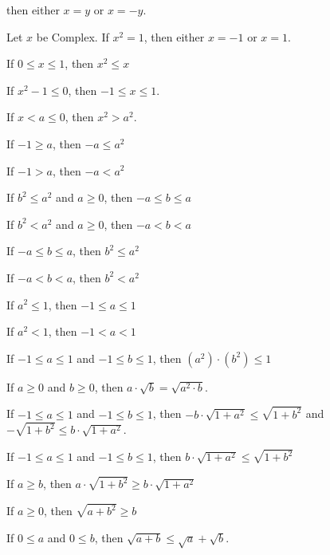 \documentclass{article}
\begin{document}
\begin{thm}
  then either $x=y$ or $x=-y$.
\item\label{square1:41} Let $x$ be Complex. If $x^{2}=1$, then either
  $x=-1$ or $x=1$.
\item\label{square1:42} If $0\leq x\leq1$, then $x^{2}\leq x$
\item\label{square1:43} If $x^{2}-1\leq0$, then $-1\leq x\leq1$.
\item\label{square1:44} If $x<a\leq0$, then $x^{2}>a^{2}$.
\item\label{square1:45} If $-1\geq a$, then $-a\leq a^{2}$
\item\label{square1:46} If $-1>a$, then $-a<a^{2}$
\item\label{square1:47} If $b^{2}\leq a^{2}$ and $a\geq0$, then $-a\leq b\leq a$
\item\label{square1:48} If $b^{2}<a^{2}$ and $a\geq0$, then $-a<b<a$
\item\label{square1:49} If $-a\leq b\leq a$, then $b^{2}\leq a^{2}$
\item\label{square1:50} If $-a<b<a$, then $b^{2}<a^{2}$
\item\label{square1:51} If $a^{2}\leq1$, then $-1\leq a\leq 1$
\item\label{square1:52} If $a^{2}<1$, then $-1<a<1$
\item\label{square1:53} If $-1\leq a\leq 1$ and $-1\leq b\leq 1$, then
  $(a^{2})\cdot(b^{2})\leq1$
\item\label{square1:54} If $a\geq0$ and $b\geq0$, then
  $a\cdot\sqrt{b}=\sqrt{a^{2}\cdot b}$.
\item\label{square1:55} If $-1\leq a\leq1$ and $-1\leq b\leq1$,
  then $-b\cdot\sqrt{1+a^{2}}\leq\sqrt{1+b^{2}}$ and
  $-\sqrt{1+b^{2}}\leq b\cdot\sqrt{1+a^{2}}$.
\item\label{square1:56} If $-1\leq a\leq1$ and $-1\leq b\leq 1$,
  then $b\cdot\sqrt{1+a^{2}}\leq\sqrt{1+b^{2}}$
\item\label{square1:57} If $a\geq b$, then $a\cdot\sqrt{1+b^{2}}\geq b\cdot\sqrt{1+a^{2}}$
\item\label{square1:58} If $a\geq0$, then $\sqrt{a+b^{2}}\geq b$
\item\label{square1:59} If $0\leq a$ and $0\leq b$,
  then $\sqrt{a+b}\leq\sqrt{a}+\sqrt{b}$.
\end{thm}
\end{document}
